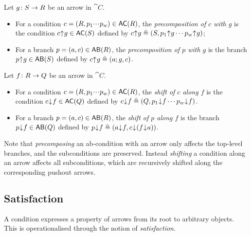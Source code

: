\begin{definition}
  \label{def:precomposition}
Let $g\colon S \rightarrow R$ be an arrow in $\cat{C}$. 
\begin{itemize}[defsep]
\item For a condition $c=(R,p_1\ccdots p_w)\in \AC R$, the \emph{precomposition of $c$ with $g$} is the condition $\bshift{c}{g} \in \AC{S}$ defined by $\bshift{c}{g} \isdef (S,\bshift{p_1}{g} \cdots \bshift{p_w}{g})$;
\item For a branch $p=(a,c)\in \AB R$, the \emph{precomposition of $p$ with $g$} is the branch $\bshift p g\in \AB S $ defined by $\bshift c g\isdef (a;g,c)$.
\end{itemize}
\end{definition}

\begin{definition}
  \label{def:shift}
Let $f\colon R \rightarrow Q$ be an arrow in $\cat C$.
\begin{itemize}[defsep]
\item For a condition $c=(R,p_1\ccdots p_w)\in \AC R$, the \emph{shift of $c$ along $f$} is the condition $\shift{c}{f} \in \AC{Q}$ defined by  $\shift{c}{f} \isdef (Q, \shift{p_1}{f}\cdots \shift{p_w}{f})$.

\item For a branch $p=(a,c)\in \AB R$, the  \emph{shift of $p$ along $f$}  is the branch $\shift{p}{f} \in \AB{Q}$ defined by $\shift p f\isdef (a \tdarr f, \shift{c}{(f\tdarr {a})})$.
\end{itemize}
\end{definition}
%
Note that \emph{precomposing} an ab-condition with an arrow only affects the top-level branches, and the subconditions are preserved. Instead \emph{shifting} a condition along an arrow affects all subconditions, which are recursively shifted along the corresponding pushout arrows. 

\subsection{Satisfaction}

A condition expresses a property of arrows from its root to arbitrary objects. This is operationalised through the notion of \emph{satisfaction}.

